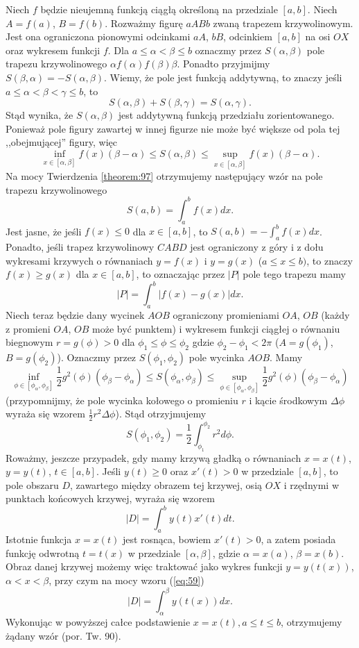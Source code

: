 \documentclass[leqno]{article}
\begin{document}
\begin{justify}
Niech $f$ będzie nieujemną funkcją ciągłą określoną na przedziale $[a,b]$. 
Niech $A = f(a)$, $B = f(b)$. Rozważmy figurę $aABb$ zwaną trapezem krzywolinowym. 
Jest ona ograniczona pionowymi odcinkami $aA$, $bB$, odcinkiem $[a,b]$ na osi $OX$ oraz wykresem funkcji $f$.
Dla $a \leqslant \alpha < \beta \leqslant b$ oznaczmy przez $S(\alpha, \beta)$ pole trapezu krzywolinowego
$\alpha f(\alpha) f(\beta) \beta$. Ponadto przyjmijmy $S(\beta, \alpha) = -S(\alpha, \beta)$. Wiemy, że pole jest funkcją 
addytywną, to znaczy jeśli $a \leqslant \alpha < \beta < \gamma \leqslant b$, to
\[
    S(\alpha, \beta)  + S(\beta, \gamma) = S(\alpha, \gamma).
\]
Stąd wynika, że $S(\alpha, \beta)$ jest addytywną funkcją przedziału zorientowanego.
Ponieważ pole figury zawartej w innej figurze nie może być większe od pola tej ,,obejmującej'' figury, więc
\[
    \inf\limits_{x \in [\alpha, \beta]} f(x)(\beta - \alpha) \leqslant S(\alpha, \beta) \leqslant \sup\limits_{x \in [\alpha, \beta]} f(x)(\beta - \alpha).
\]
Na mocy Twierdzenia \ref{theorem:97} otrzymujemy następujący wzór na pole trapezu krzywolinowego
\begin{equation}\label{eq:59}
    S(a, b) = \int_{a}^{b} f(x)dx.
\end{equation}
Jest jasne, że jeśli $f(x) \leqslant 0$ dla $x \in [a,b]$, to $S(a,b) = -\int_{a}^{b}f(x)dx$. 
Ponadto, jeśli trapez krzywolinowy $CABD$ jest ograniczony z góry i z dołu wykresami krzywych o równaniach $y = f(x)$ i $y = g(x)$ ($a \leqslant x \leqslant b)$, to znaczy
$f(x) \geqslant g(x)$ dla $x \in [a,b]$, to oznaczając przez $|P|$ pole tego trapezu mamy
\[
    |P| = \int_{a}^{b}|f(x) - g(x)|dx.
\]
Niech teraz będzie dany wycinek $AOB$ ograniczony promieniami $OA$, $OB$ (każdy z promieni
$OA$, $OB$ może być punktem) i wykresem funkcji ciągłej o równaniu biegnowym
$r = g(\phi) > 0$ dla $\phi_1 \leqslant \phi \leqslant \phi_2$ gdzie $\phi_2 - \phi_1 < 2\pi$ ($A = g(\phi_1)$, $B = g(\phi_2)$). Oznaczmy
przez $S(\phi_1, \phi_2)$ pole wycinka $AOB$. Mamy
\[
    \inf\limits_{\phi \in [\phi_\alpha, \phi_\beta]} \frac{1}{2}g^2(\phi)(\phi_\beta - \phi_\alpha)
    \leqslant S(\phi_\alpha, \phi_\beta) \leqslant
    \sup\limits_{\phi \in [\phi_\alpha, \phi_\beta]} \frac{1}{2}g^2(\phi)(\phi_\beta - \phi_\alpha)
\]
(przypomnijmy, że pole wycinka kołowego o promieniu $r$ i kącie środkowym $\Delta \phi$ wyraża się wzorem
$\frac{1}{2}r^2\Delta \phi$). Stąd otrzyjmujemy
\[
    S(\phi_1, \phi_2) = \frac{1}{2} \int_{\phi_1}^{\phi_2}r^2 d\phi.
\]
Roważmy, jeszcze przypadek, gdy mamy krzywą gładką o równaniach $x = x(t)$, $y = y(t)$, $t \in [a,b]$. Jeśli $y(t) \geqslant 0$
oraz $x'(t) > 0$ w przedziale $[a,b]$, to pole obszaru $D$, zawartego między obrazem tej krzywej, osią $OX$ i rzędnymi w punktach końcowych krzywej,
wyraża się wzorem
\[
    |D| = \int_{a}^{b}y(t)x'(t)dt.
\]
Istotnie funkcja $x = x(t)$ jest rosnąca, bowiem $x'(t) > 0$, a zatem posiada funkcję odwrotną $t = t(x)$ w przedziale $[\alpha, \beta]$, gdzie
$\alpha = x(a)$, $\beta = x(b)$. Obraz danej krzywej możemy więc traktować jako wykres funkcji $y = y(t(x))$, $\alpha < x < \beta$, przy czym na mocy wzoru
(\ref{eq:59})
\[
    |D| = \int_{\alpha}^{\beta} y(t(x))dx.
\]
Wykonując w powyższej całce podstawienie $x = x(t), a \leqslant t \leqslant b$, otrzymujemy żądany wzór (por. Tw. 90).


\end{justify}
\end{document}
